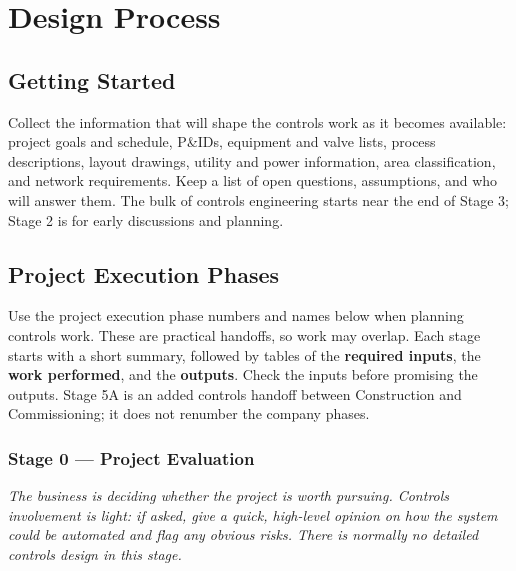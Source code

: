 \chapter{Design Process}\label{ch:design-process}
\section{Getting Started}
Collect the information that will shape the controls work as it becomes available: project goals and schedule, P\&IDs, equipment and valve lists, process descriptions, layout drawings, utility and power information, area classification, and network requirements. Keep a list of open questions, assumptions, and who will answer them. The bulk of controls engineering starts near the end of Stage 3; Stage 2 is for early discussions and planning.

\section{Project Execution Phases}
Use the project execution phase numbers and names below when planning controls work. These are practical handoffs, so work may overlap. Each stage starts with a short summary, followed by tables of the \textbf{required inputs}, the \textbf{work performed}, and the \textbf{outputs}. Check the inputs before promising the outputs. Stage 5A is an added controls handoff between Construction and Commissioning; it does not renumber the company phases.

\newcommand{\srow}[1]{\stepcounter{stagerow}\thestagerow. & #1 \\}
\newenvironment{stagetable}[1]{\par\smallskip\noindent\setcounter{stagerow}{0}%
  \begin{tabular}{@{}>{\raggedleft\arraybackslash}p{0.7cm}>{\raggedright\arraybackslash}p{\dimexpr\textwidth-0.7cm-2\tabcolsep\relax}@{}}
  \toprule
  \multicolumn{2}{@{}l}{\textbf{#1}} \\ \midrule}%
 {\bottomrule\end{tabular}\par\medskip}

\subsection{Stage 0 --- Project Evaluation}
\textit{The business is deciding whether the project is worth pursuing. Controls involvement is light: if asked, give a quick, high-level opinion on how the system could be automated and flag any obvious risks. There is normally no detailed controls design in this stage.}

